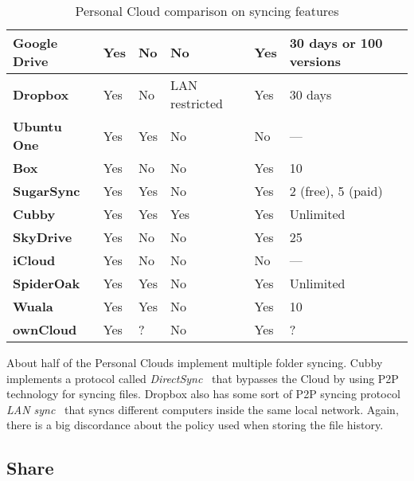 {{\begin{table}
\begin{center}
\begin{tabular}{ | p{3.3cm} | p{1.4cm} | p{1.4cm} | p{2.4cm} | p{1.4cm} | p{2.9cm} | }
	\textbf{Google Drive} &
	Yes &
	No &
	No &
	Yes &
	30 days or 100 versions \\ \hline

	\textbf{Dropbox} &
	Yes &
	No &
	LAN restricted &
	Yes &
	30 days \\ \hline
	
	\textbf{Ubuntu One} &
	Yes &
	Yes &
	No &
	No &
	--- \\ \hline
	
	\textbf{Box} &
	Yes &
	No & 
	No &
	Yes &
	10 \\ \hline
	
	\textbf{SugarSync} & 
	Yes &
	Yes &
	No &
	Yes &
	2 (free), 5 (paid) \\ \hline
	
	\textbf{Cubby} &
	Yes &
	Yes &
	Yes &
	Yes &
	Unlimited \\ \hline
	
	\textbf{SkyDrive} & 
	Yes &
	No &
	No &
	Yes &
	25 \\ \hline

	\textbf{iCloud} &
	Yes &
	No &
	No &
	No &
	--- \\ \hline
	
	\textbf{SpiderOak} & 
	Yes &
	Yes &
	No &
	Yes &
	Unlimited \\ \hline

	\textbf{Wuala} &
	Yes &
	Yes &
	No &
	Yes &
	10 \\ \hline
	
	\textbf{ownCloud} &
	Yes &
	? &
	No &
	Yes &
	? \\ \hline

    \end{tabular}
    \caption{Personal Cloud comparison on syncing features}
    \label{tab:pc_syncing}
\end{center}
\end{table}
}

About half of the Personal Clouds implement multiple folder syncing. Cubby implements a protocol called \textit{DirectSync}~\cite{directsync} that bypasses the Cloud by using P2P technology for syncing files. Dropbox also has some sort of P2P syncing protocol \textit{LAN sync}~\cite{lansync} that syncs different computers inside the same local network. Again, there is a big discordance about the policy used when storing the file history.




\subsection{Share}


}
